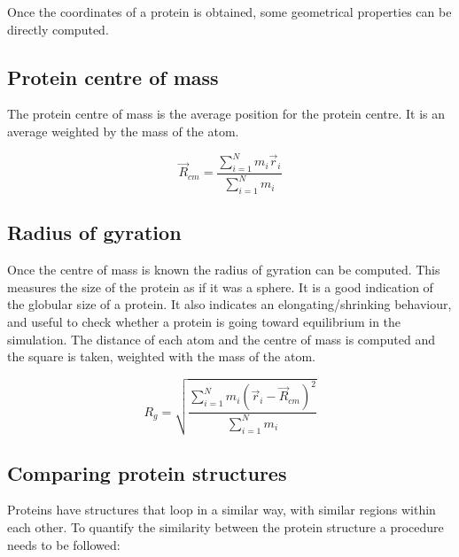 Once the coordinates of a protein is obtained, some geometrical properties can be directly computed.

	\subsection{Protein centre of mass}
	The protein centre of mass is the average position for the protein centre.
	It is an average weighted by the mass of the atom.

	$$\vec{R}_{cm} = \frac{\sum\limits_{i=1}^Nm_i\vec{r}_i}{\sum\limits_{i=1}^Nm_i}$$

	\subsection{Radius of gyration}
	Once the centre of mass is known the radius of gyration can be computed.
	This measures the size of the protein as if it was a sphere.
	It is a good indication of the globular size of a protein.
	It also indicates an elongating/shrinking behaviour, and useful to check whether a protein is going toward equilibrium in the simulation.
	The distance of each atom and the centre of mass is computed and the square is taken, weighted with the mass of the atom.

	$$R_g = \sqrt{\frac{\sum\limits_{i=1}^Nm_i(\vec{r}_i-\vec{R}_{cm})^2}{\sum\limits_{i=1}^Nm_i}}$$

	\subsection{Comparing protein structures}
	Proteins have structures that loop in a similar way, with similar regions within each other.
	To quantify the similarity between the protein structure a procedure needs to be followed:


